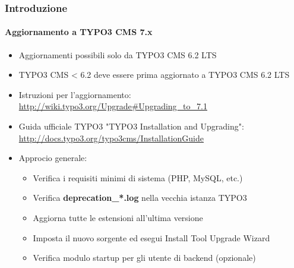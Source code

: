 \begin{frame}[fragile]
	\frametitle{Introduzione}
	\framesubtitle{Aggiornamento a TYPO3 CMS 7.x}

	\begin{itemize}
		\item Aggiornamenti possibili solo da TYPO3 CMS 6.2 LTS
		\item TYPO3 CMS < 6.2 deve essere prima aggiornato a TYPO3 CMS 6.2 LTS
	\end{itemize}

	\begin{itemize}

		\item Istruzioni per l'aggiornamento:\newline
			\smaller\url{http://wiki.typo3.org/Upgrade#Upgrading_to_7.1}\normalsize
		\item Guida ufficiale TYPO3 "TYPO3 Installation and Upgrading":
			\smaller\url{http://docs.typo3.org/typo3cms/InstallationGuide}\normalsize
		\item Approcio generale:
			\begin{itemize}
				\item Verifica i requisiti minimi di sistema \small(PHP, MySQL, etc.)
				\item Verifica \textbf{deprecation\_*.log} nella vecchia istanza TYPO3
				\item Aggiorna tutte le estensioni all'ultima versione
				\item Imposta il nuovo sorgente ed esegui Install Tool \textrightarrow Upgrade Wizard
				\item Verifica modulo startup per gli utente di backend (opzionale)
			\end{itemize}
	\end{itemize}

\end{frame}

